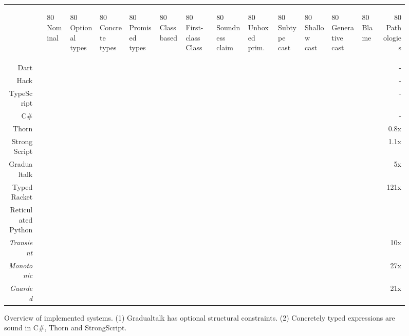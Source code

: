 \documentclass[a4paper,USenglish]{tex/lipics-v2016}
\begin{document}

\newcommand{\rot}[1]{\begin{rotate}{80} #1 \end{rotate}}
\newcommand{\X}{\EM{\bullet}}
\newcommand{\XX}{\EM{\bullet^{(2)}}}
\newcommand{\XY}{\EM{\bullet^{(1)}}}

\begin{figure}[!ht]
  \center
~ \\[2cm]
  {\small
\begin{tabular}{r|lllllllllllllr}
& & \rot{Nominal}
  & \rot{Optional types}
  & \rot{Concrete types}
  & \rot{Promised types}
  & \rot{Class based}
  & \rot{First-class Class}
  & \rot{Soundness claim}
  & \rot{Unboxed prim.}
  & \rot{Subtype cast}
  & \rot{Shallow cast}
  & \rot{Generative cast}
  & \rot{Blame}
  & \rot{Pathologies}
  \\
Dart         &&\X &\X &   &   &\X &   &    &    &\X &   &   &   &  - 
\\\hline
Hack         &&\X &\X &   &   &\X &   &    &    &\X &   &   &   &  -  
\\\hline
TypeScript   &&   &\X &   &   &\X &   &    &    &   &   &   &   &  -  
\\\hline
C\#          &&\X &\X &\X &   &\X &   &\XX & \X &\X &   &   &   &  -  
\\\hline
Thorn        &&\X &\X &\X &   &\X &   &\XX & \X &\X &   &   &   & 0.8x
\\\hline
StrongScript &&\X &\X &\X &\X &\X &   &\XX &    &\X &   &\X &   & 1.1x   
\\\hline
Gradualtalk  &&\XY&   &   &\X &\X &   & \X &    &   &   &\X &\X &  5x
\\\hline
Typed Racket &&   &   &   &\X &\X &\X &\X  &    &   &\X &\X &\X & 121x 
\\\hline
Reticulated Python    \\
\it Transient&&   &\X &   &   & \X &  & \X &    &   &\X &   &\X & 10x \\
\it Monotonic&&   &   &   &\X & \X &  & \X &    &   &   &\X &\X &  27x\\
\it Guarded  &&   &   &   &\X & \X &  & \X &    &   &   &\X &\X &  21x\\
\end{tabular}}
  \caption{Overview of implemented systems. (1) Gradualtalk has optional
    structural constraints. (2) Concretely typed expressions are sound in
    C\#, Thorn and StrongScript.}\label{over}
\end{figure}
\end{document}
